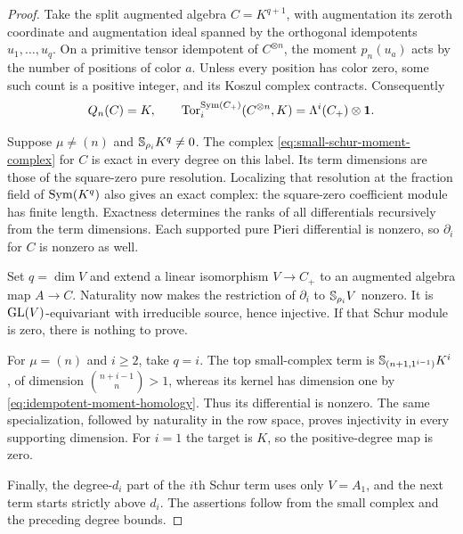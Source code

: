 \begin{proof}
Take the split augmented algebra $C=K^{q+1}$, with augmentation its
zeroth coordinate and augmentation ideal spanned by the orthogonal
idempotents $u_1,\ldots,u_q$. On a primitive tensor idempotent of
$C^{\otimes n}$, the moment $p_n(u_a)$ acts by the number of positions
of color $a$. Unless every position has color zero, some such count
is a positive integer, and its Koszul complex contracts. Consequently
\begin{equation}\label{eq:idempotent-moment-homology}
 Q_n(C)=K,\qquad
 \operatorname{Tor}_i^{\operatorname{Sym}(C_+)}(C^{\otimes n},K)
                      =\Lambda^i(C_+)\otimes\mathbf1.
\end{equation}

Suppose $\mu\ne(n)$ and $\mathbb S_{\rho_i}K^q\ne0$.
The complex \eqref{eq:small-schur-moment-complex} for $C$ is exact
in every degree on this label. Its term dimensions are those of the
square-zero pure resolution. Localizing that resolution at the fraction
field of $\operatorname{Sym}(K^q)$ also gives an exact complex: the square-zero
coefficient module has finite length. Exactness determines the ranks
of all differentials recursively from the term dimensions. Each
supported pure Pieri differential is nonzero, so $\partial_i$ for
$C$ is nonzero as well.

Set $q=\dim V$ and extend a linear isomorphism $V\to C_+$ to an
augmented algebra map $A\to C$. Naturality now makes the restriction
of $\partial_i$ to $\mathbb S_{\rho_i}V$ nonzero. It is $\operatorname{GL}(V)$-equivariant
with irreducible source, hence injective. If that Schur module is zero,
there is nothing to prove.

For $\mu=(n)$ and $i\ge2$, take $q=i$. The top small-complex term is
$\mathbb S_{(n+1,1^{i-1})}K^i$, of dimension
$\binom{n+i-1}{n}>1$, whereas its kernel has dimension one by
\eqref{eq:idempotent-moment-homology}. Thus its differential is nonzero.
The same specialization, followed by naturality in the row space,
proves injectivity in every supporting dimension. For $i=1$ the
target is $K$, so the positive-degree map is zero.

Finally, the degree-$d_i$ part of the $i$th Schur term uses only
$V=A_1$, and the next term starts strictly above $d_i$. The assertions
follow from the small complex and the preceding degree bounds.
\end{proof}

